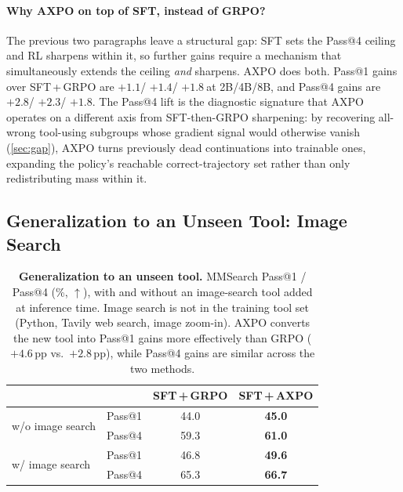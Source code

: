\documentclass{llmxive}
\providecommand{\dPassFourTwoB}{$+2.8$}
\providecommand{\dPassFourFourB}{$+2.3$}
\providecommand{\dPassFourEightB}{$+1.8$}
\providecommand{\dPassOneTwoB}{$+1.1$}
\providecommand{\dPassOneFourB}{$+1.4$}
\providecommand{\dPassOneEightB}{$+1.8$}
\begin{document}
\paragraph{Why AXPO on top of SFT, instead of GRPO?}
The previous two paragraphs leave a structural gap: SFT sets the Pass@4 ceiling and RL sharpens within it, so further gains require a mechanism that simultaneously extends the ceiling \emph{and} sharpens. AXPO does both. Pass@1 gains over SFT\,+\,GRPO are \dPassOneTwoB / \dPassOneFourB / \dPassOneEightB $\ $at 2B/4B/8B, and Pass@4 gains are \dPassFourTwoB / \dPassFourFourB / \dPassFourEightB. The Pass@4 lift is the diagnostic signature that AXPO operates on a different axis from SFT-then-GRPO sharpening: by recovering all-wrong tool-using subgroups whose gradient signal would otherwise vanish (\autoref{sec:gap}), AXPO turns previously dead continuations into trainable ones, expanding the policy's reachable correct-trajectory set rather than only redistributing mass within it.

\subsection{Generalization to an Unseen Tool: Image Search}
\label{app:image-search-gen}
\begin{table}[t]
    \centering
    \small
    \begin{tabular}{l l c c}
        \toprule
        & & SFT\,+\,GRPO & SFT\,+\,AXPO \\
        \midrule
        \multirow{2}{*}{w/o image search}
            & Pass@1 & 44.0 & \bf 45.0 \\
            & Pass@4 & 59.3 & \bf 61.0 \\
        \midrule
        \multirow{2}{*}{w/\phantom{o} image search}
            & Pass@1 & 46.8 & \textbf{49.6} \\
            & Pass@4 & 65.3 & \textbf{66.7} \\
        \bottomrule
    \end{tabular}
\caption{\textbf{Generalization to an unseen tool.} MMSearch Pass@1 / Pass@4 (\%, $\uparrow$), with and without an image-search tool added at inference time. Image search is not in the training tool set (Python, Tavily web search, image zoom-in). AXPO converts the new tool into Pass@1 gains more effectively than GRPO ($+4.6$\,pp vs.\ $+2.8$\,pp), while Pass@4 gains are similar across the two methods.}
\label{tab:image-search-gen}
\end{table}
\end{document}
